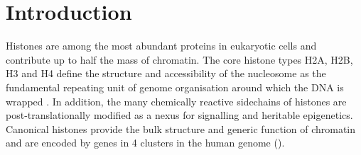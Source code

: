 \section{Introduction}

  Histones are among the most abundant proteins in eukaryotic cells 
  and contribute up to half the mass of chromatin. 
  The core histone types H2A, H2B, H3 and H4 
  define the structure and accessibility of the nucleosome 
  as the fundamental repeating unit of genome organisation 
  around which the DNA is wrapped \citep{Luger1997structure}.
  In addition, the many chemically reactive sidechains of histones 
  are post-translationally modified 
  as a nexus for signalling and heritable epigenetics.
  Canonical histones provide the bulk structure and generic function of chromatin
  and are encoded by \TotalGenes{} genes in 4 clusters in the human genome ().


